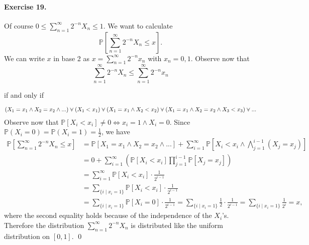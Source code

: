 \documentclass[12pt,a4paper]{report}
\theoremstyle{definition}
\theoremstyle{num.custom-title}
\newcommand{\veedot}{\mathbin{\mathaccent\cdot\vee}}
\renewcommand{\P}{\mathbb{P}}
\renewcommand{\1}{\mathbbm{1}}
\begin{document}
\paragraph{Exercise 19.} Of course $0 \leq \sum_{n=1}^\infty 2^{-n} X_n \leq 1$. We want to calculate 
\[
\P \left[ \sum_{n=1}^\infty 2^{-n} X_n \leq x \right].
\]
We can write $x$ in base 2 as $x= \sum_{n=1}^\infty 2^{-n} x_n$ with $x_n=0,1$. Observe now that
\[
\sum_{n=1}^\infty 2^{-n} X_n \leq \sum_{n=1}^\infty 2^{-n} x_n 
\]
\centerline{if and only if }
\[
(X_1=x_1 \wedge X_2=x_2 \wedge ... ) \veedot (X_1 < x_1) \veedot (X_1=x_1 \wedge X_2 < x_2) \veedot (X_1=x_1 \wedge X_2=x_2 \wedge X_3 < x_3) \veedot ... 
\]
Observe now that $\P[X_i<x_i] \neq 0 \iff x_i=1 \wedge X_i=0$. Since $\P(X_i=0)=\P(X_i=1)=\frac{1}{2}$, we have
\begin{align*}
\P \left[ \sum_{n=1}^\infty 2^{-n} X_n \leq x \right]
&= \P[X_1=x_1 \wedge X_2=x_2 \wedge ...] + \sum_{i=1}^\infty \P \left[ X_i<x_i \wedge \bigwedge_{j=1}^{i-1} (X_j=x_j) \right]\\
&= 0 + \sum_{i=1}^\infty \left( \P[X_i<x_i] \prod_{j=1}^{i-1} \P[X_j=x_j] \right)\\
&= \sum_{i=1}^\infty \P[X_i<x_i] \cdot \frac{1}{2^{i-1}}\\
&= \sum_{\{i \mid x_i=1\}} \P[X_i<x_i] \cdot \frac{1}{2^{i-1}}\\ 
&= \sum_{\{i \mid x_i=1\}} \P[X_i=0] \cdot \frac{1}{2^{i-1}} = \sum_{\{i \mid x_i=1\}} \frac{1}{2} \cdot \frac{1}{2^{i-1}} = \sum_{\{i \mid x_i=1\}} \frac{1}{2^i} = x,
\end{align*}
where the second equality holds because of the independence of the $X_i$'s.\\
Therefore the distribution $\sum_{n=1}^\infty 2^{-n} X_n$ is distributed like the uniform distribution on $[0,1]$. \qed
\end{document}
